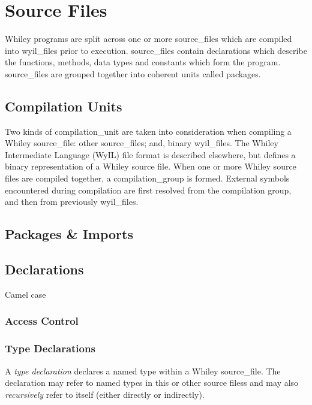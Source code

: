 \chapter{Source Files}

Whiley programs are split across one or more \gls{source_file}s which
are compiled into \gls{wyil_file}s prior to execution.
\Gls{source_file}s contain declarations which describe the functions,
methods, data types and constants which form the program.
\Gls{source_file}s are grouped together into coherent units called
\gls{package}s.


\section{Compilation Units}

Two kinds of \gls{compilation_unit} are taken into consideration when compiling a Whiley \gls{source_file}: other \gls{source_file}s; and, binary \gls{wyil_file}s.  The Whiley Intermediate Language (WyIL) file format is described elsewhere, but defines a binary representation of a Whiley source file.  When one or more Whiley source files are compiled together, a \gls{compilation_group} is formed.  External symbols encountered during compilation are first resolved from the compilation group, and then from previously \gls{wyil_file}s.

\section{Packages \& Imports}

\section{Declarations}

Camel case

\subsection{Access Control}


\subsection{Type Declarations}

A {\em type declaration} declares a named type within a Whiley
\gls{source_file}.  The declaration may refer to named types in this
or other source filess and may also {\em recursively}
refer to itself (either directly or indirectly).

